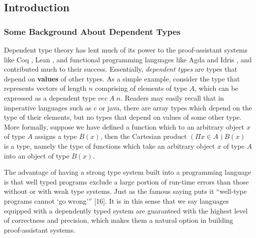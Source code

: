 \documentclass{article}
\theoremstyle{remark}
\begin{document}
\subsection{Introduction}
\subsubsection{Some Background About Dependent Types}
Dependent type theory has lent much of its power to the proof-assistant systems like Coq \cite{huet1997coq}, Lean \cite{de2015lean}, and functional programming languages like Agda \cite{norell2008dependently} and Idris \cite{brady2013idris}, and contributed much to their success. Essentially, \emph{dependent types} are types that depend on \textbf{values} of other types. As a simple example, consider the type that represents vectors of length $n$ comprising of elements of type $A$, which can be expressed as a dependent type $vec\; A\; n$. Readers may easily recall that in imperative languages such as c or java, there are array types which depend on the type of their elements, but no types that depend on values of some other type. More formally, suppose we have defined a function which to an arbitrary object $x$ of type $A$ assigns a type $B(x)$, then the Cartesian product $(\Pi x \in A)B(x)$ is a type, namely the type of functions which take an arbitrary object $x$ of type $A$ into an object of type $B(x)$.

The advantage of having a strong type system built into a programming language is that well typed programs exclude a large portion of run-time errors than those without or with weak type systems. Just as the famous saying puts it “well-type programs cannot ‘go wrong’” [16]. It is in this sense that we say languages equipped with a dependently typed system are guaranteed with the highest level of correctness and precision, which makes them a natural option in building proof-assistant systems.
\end{document}
